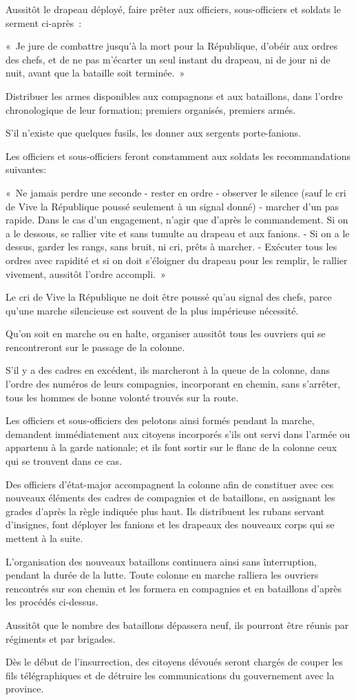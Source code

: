 \documentclass[french,twoside]{book} %
\begin{document}
Aussitôt le drapeau déployé, faire prêter aux officiers, sous-officiers et soldats le serment ci-après :\par
« Je jure de combattre jusqu’à la mort pour la République, d’obéir aux ordres des chefs, et de ne pas m’écarter un seul instant du drapeau, ni de jour ni de nuit, avant que la bataille soit terminée. »\par
Distribuer les armes disponibles aux compagnons et aux bataillons, dans l’ordre chronologique de leur formation; premiers organisés, premiers armés.\par
S'il n’existe que quelques fusils, les donner aux sergents porte-fanions.\par
Les officiers et sous-officiers feront constamment aux soldats les recommandations suivantes:\par
« Ne jamais perdre une seconde - rester en ordre - observer le silence (sauf le cri de Vive la République poussé seulement à un signal donné) - marcher d’un pas rapide. Dans le cas d’un engagement, n’agir que d’après le commandement. Si on a le dessous, se rallier vite et sans tumulte au drapeau et aux fanions. - Si on a le dessus, garder les rangs, sans bruit, ni cri, prêts à marcher. - Exécuter tous les ordres avec rapidité et si on doit s’éloigner du drapeau pour les remplir, le rallier vivement, aussitôt l’ordre accompli. »\par
Le cri de Vive la République ne doit être poussé qu’au signal des chefs, parce qu’une marche silencieuse est souvent de la plus impérieuse nécessité.\par
Qu'on soit en marche ou en halte, organiser aussitôt tous les ouvriers qui se rencontreront sur le passage de la colonne.\par
S'il y a des cadres en excédent, ils marcheront à la queue de la colonne, dans l’ordre des numéros de leurs compagnies, incorporant en chemin, sans s’arrêter, tous les hommes de bonne volonté trouvés sur la route.\par
Les officiers et sous-officiers des pelotons ainsi formés pendant la marche, demandent immédiatement aux citoyens incorporés s’ils ont servi dans l’armée ou appartenu à la garde nationale; et ils font sortir sur le flanc de la colonne ceux qui se trouvent dans ce cas.\par
Des officiers d’état-major accompagnent la colonne afin de constituer avec ces nouveaux éléments des cadres de compagnies et de bataillons, en assignant les grades d’après la règle indiquée plus haut. Ils distribuent les rubans servant d’insignes, font déployer les fanions et les drapeaux des nouveaux corps qui se mettent à la suite.\par
L'organisation des nouveaux bataillons continuera ainsi sans înterruption, pendant la durée de la lutte. Toute colonne en marche ralliera les ouvriers rencontrés sur son chemin et les formera en compagnies et en bataillons d’après les procédés ci-dessus.\par
Aussitôt que le nombre des bataillons dépassera neuf, ils pourront être réunis par régiments et par brigades.\par
Dès le début de l’insurrection, des citoyens dévoués seront chargés de couper les fils télégraphiques et de détruire les communications du gouvernement avec la province.
\end{document}
